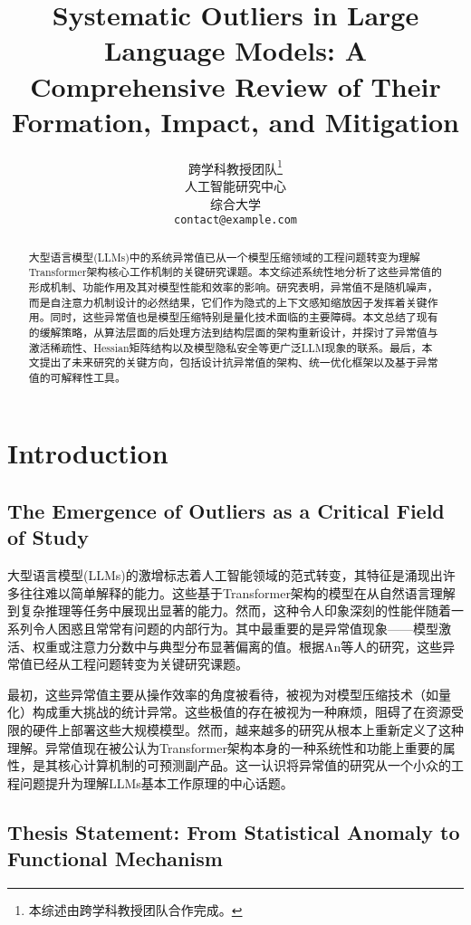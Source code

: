 \documentclass{article}
\title{Systematic Outliers in Large Language Models: A Comprehensive Review of Their Formation, Impact, and Mitigation}
\author{%
  跨学科教授团队\thanks{本综述由跨学科教授团队合作完成。}\\
  人工智能研究中心\\
  综合大学\\
  \texttt{contact@example.com}
}
\begin{document}
\maketitle

\begin{abstract}
  大型语言模型(LLMs)中的系统异常值已从一个模型压缩领域的工程问题转变为理解Transformer架构核心工作机制的关键研究课题。本文综述系统性地分析了这些异常值的形成机制、功能作用及其对模型性能和效率的影响。研究表明，异常值不是随机噪声，而是自注意力机制设计的必然结果，它们作为隐式的上下文感知缩放因子发挥着关键作用。同时，这些异常值也是模型压缩特别是量化技术面临的主要障碍。本文总结了现有的缓解策略，从算法层面的后处理方法到结构层面的架构重新设计，并探讨了异常值与激活稀疏性、Hessian矩阵结构以及模型隐私安全等更广泛LLM现象的联系。最后，本文提出了未来研究的关键方向，包括设计抗异常值的架构、统一优化框架以及基于异常值的可解释性工具。
\end{abstract}

\section{Introduction}

\subsection{The Emergence of Outliers as a Critical Field of Study}

大型语言模型(LLMs)的激增标志着人工智能领域的范式转变，其特征是涌现出许多往往难以简单解释的能力。这些基于Transformer架构的模型在从自然语言理解到复杂推理等任务中展现出显著的能力。然而，这种令人印象深刻的性能伴随着一系列令人困惑且常常有问题的内部行为。其中最重要的是异常值现象——模型激活、权重或注意力分数中与典型分布显著偏离的值。根据An等人\cite{an2025systematic}的研究，这些异常值已经从工程问题转变为关键研究课题。

最初，这些异常值主要从操作效率的角度被看待，被视为对模型压缩技术（如量化）构成重大挑战的统计异常。这些极值的存在被视为一种麻烦，阻碍了在资源受限的硬件上部署这些大规模模型。然而，越来越多的研究从根本上重新定义了这种理解。异常值现在被公认为Transformer架构本身的一种系统性和功能上重要的属性，是其核心计算机制的可预测副产品。这一认识将异常值的研究从一个小众的工程问题提升为理解LLMs基本工作原理的中心话题。

\subsection{Thesis Statement: From Statistical Anomaly to Functional Mechanism}
\end{document}
